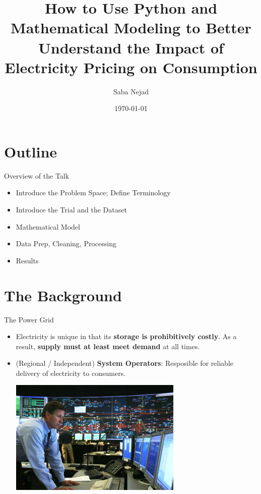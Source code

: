 \documentclass{beamer}
\title{How to Use Python and Mathematical Modeling to Better Understand the Impact of Electricity Pricing on Consumption}
\date{\today}
\author{Saba Nejad}
\begin{document}
\maketitle

\section{Outline}

\begin{frame}{Overview of the Talk}
  \begin{itemize}
  \item Introduce the Problem Space; Define Terminology
  \item Introduce the Trial and the Dataset
  \item Mathematical Model
  \item Data Prep, Cleaning, Processing
  \item Results
  \end{itemize}
\end{frame}

\section{The Background}

\begin{frame}{The Power Grid}
  \begin{itemize}
    \item<+-> Electricity is unique in that its \textbf{storage is prohibitively costly}. As a result, \textbf{supply must at least meet demand} at all times. 
    \item<+-> (Regional / Independent) \textbf{System Operators}: Resposible for reliable delivery of electricity to consumers.
    \begin{center}
      \includegraphics[width=0.65\textwidth]{images/iso-control-room.png}
    \end{center}
  \end{itemize}
\end{frame}
\end{document}
